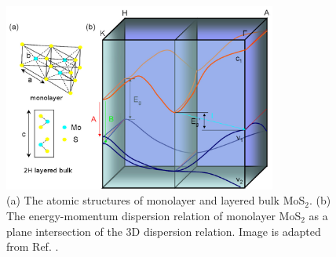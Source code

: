 \begin{figure}[htbp!] 
\centering  
\includegraphics[width=0.8\textwidth]{mos2_band.png}
\caption[The atomic structures of monolayer and layered bulk MoS$_2$]{(a) The atomic structures of monolayer and layered bulk MoS$_2$. (b) The energy-momentum dispersion relation of monolayer MoS$_2$ as a plane intersection of the 3D dispersion relation. Image is adapted from Ref. \cite{Mak2010}. }  
\label{fig:mos2_band}
\end{figure} 

